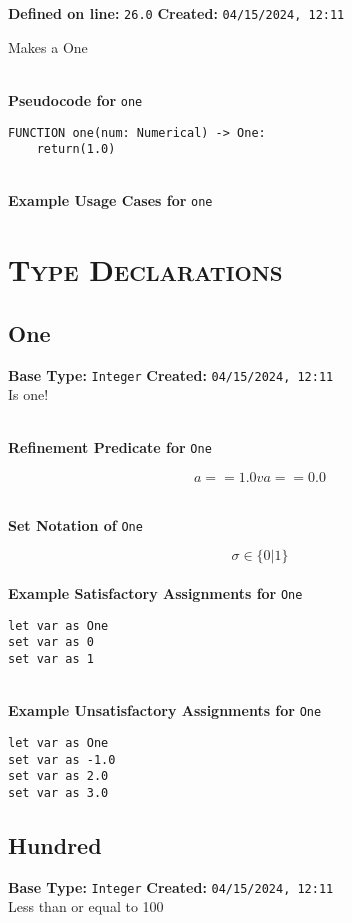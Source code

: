 \documentclass{article}
\begin{document}
\textbf{Defined on line:} \verb|26.0| \hfill \textbf{Created:} \verb|04/15/2024, 12:11| 


Makes a One

\textbf{\\ Pseudocode for } \texttt{one}
\begin{verbatim}
FUNCTION one(num: Numerical) -> One:
	return(1.0)
\end{verbatim}

\textbf{\\ Example Usage Cases for } \texttt{one}
\clearpage

\section{\textsc{Type Declarations}}

\subsection{One}
\textbf{Base Type:} \verb|Integer| \hfill \textbf{Created:} \verb|04/15/2024, 12:11| \\
Is one!

\textbf{\\ Refinement Predicate for } \texttt{One}

$$ a == 1.0 v a == 0.0 $$

\textbf{\\ Set Notation of } \texttt{One}

$$\sigma \in \{ 0 | 1 \}$$ \ \
\textbf{\\ Example Satisfactory Assignments for } \texttt{One}
\begin{verbatim}
let var as One
set var as 0
set var as 1
\end{verbatim}


\textbf{\\ Example Unsatisfactory Assignments for } \texttt{One}
\begin{verbatim}
let var as One
set var as -1.0
set var as 2.0
set var as 3.0
\end{verbatim}


\clearpage

\subsection{Hundred}
\textbf{Base Type:} \verb|Integer| \hfill \textbf{Created:} \verb|04/15/2024, 12:11| \\
Less than or equal to 100
\end{document}
